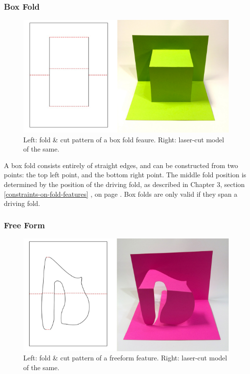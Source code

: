 \subsubsection{Box Fold}\label{box-fold}

\begin{figure}[htbp]
\centering
\includegraphics{figures/33_UI_Interface_Data_Structures/box.pdf}
\caption{Left: fold \& cut pattern of a box fold feaure. Right:
laser-cut model of the same.}
\end{figure}

A box fold consists entirely of straight edges, and can be constructed
from two points: the top left point, and the bottom right point. The
middle fold position is determined by the position of the driving fold,
as described in Chapter 3, section \ref{constraints-on-fold-features} ,
 on page
\pageref{geometric-constraints}. Box folds are only valid if they span a
driving fold.

\subsubsection{Free Form}\label{free-form}

\begin{figure}[htbp]
\centering
\includegraphics{figures/33_UI_Interface_Data_Structures/free.pdf}
\caption{Left: fold \& cut pattern of a freeform feature. Right:
laser-cut model of the same.}
\end{figure}

